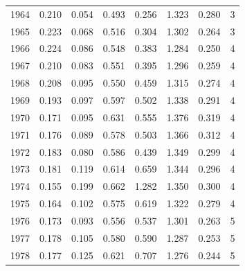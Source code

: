 \begin{longtable}{rrrrrrrr}
1964 & 0.210 & 0.054 & 0.493 & 0.256 & 1.323 & 0.280 & 3\\
1965 & 0.223 & 0.068 & 0.516 & 0.304 & 1.302 & 0.264 & 3\\
1966 & 0.224 & 0.086 & 0.548 & 0.383 & 1.284 & 0.250 & 4\\
1967 & 0.210 & 0.083 & 0.551 & 0.395 & 1.296 & 0.259 & 4\\
1968 & 0.208 & 0.095 & 0.550 & 0.459 & 1.315 & 0.274 & 4\\
1969 & 0.193 & 0.097 & 0.597 & 0.502 & 1.338 & 0.291 & 4\\
1970 & 0.171 & 0.095 & 0.631 & 0.555 & 1.376 & 0.319 & 4\\
1971 & 0.176 & 0.089 & 0.578 & 0.503 & 1.366 & 0.312 & 4\\
1972 & 0.183 & 0.080 & 0.586 & 0.439 & 1.349 & 0.299 & 4\\
1973 & 0.181 & 0.119 & 0.614 & 0.659 & 1.344 & 0.296 & 4\\
1974 & 0.155 & 0.199 & 0.662 & 1.282 & 1.350 & 0.300 & 4\\
1975 & 0.164 & 0.102 & 0.575 & 0.619 & 1.322 & 0.279 & 4\\
1976 & 0.173 & 0.093 & 0.556 & 0.537 & 1.301 & 0.263 & 5\\
1977 & 0.178 & 0.105 & 0.580 & 0.590 & 1.287 & 0.253 & 5\\
1978 & 0.177 & 0.125 & 0.621 & 0.707 & 1.276 & 0.244 & 5\\
\bottomrule
\end{longtable}
